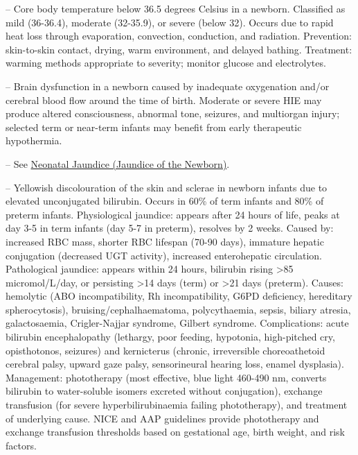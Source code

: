 -- Core body temperature below 36.5 degrees Celsius in a newborn. Classified as mild (36-36.4), moderate (32-35.9), or severe (below 32). Occurs due to rapid heat loss through evaporation, convection, conduction, and radiation. Prevention: skin-to-skin contact, drying, warm environment, and delayed bathing. Treatment: warming methods appropriate to severity; monitor glucose and electrolytes.

-- Brain dysfunction in a newborn caused by inadequate oxygenation and/or cerebral blood flow around the time of birth. Moderate or severe HIE may produce altered consciousness, abnormal tone, seizures, and multiorgan injury; selected term or near-term infants may benefit from early therapeutic hypothermia.

-- See \hyperlink{Neonatal Jaundice (Jaundice of the Newborn)}{Neonatal Jaundice (Jaundice of the Newborn)}.

-- Yellowish discolouration of the skin and sclerae in newborn infants due to elevated unconjugated bilirubin. Occurs in 60\% of term infants and 80\% of preterm infants. Physiological jaundice: appears after 24 hours of life, peaks at day 3-5 in term infants (day 5-7 in preterm), resolves by 2 weeks. Caused by: increased RBC mass, shorter RBC lifespan (70-90 days), immature hepatic conjugation (decreased UGT activity), increased enterohepatic circulation. Pathological jaundice: appears within 24 hours, bilirubin rising >85 micromol/L/day, or persisting >14 days (term) or >21 days (preterm). Causes: hemolytic (ABO incompatibility, Rh incompatibility, G6PD deficiency, hereditary spherocytosis), bruising/cephalhaematoma, polycythaemia, sepsis, biliary atresia, galactosaemia, Crigler-Najjar syndrome, Gilbert syndrome. Complications: acute bilirubin encephalopathy (lethargy, poor feeding, hypotonia, high-pitched cry, opisthotonos, seizures) and kernicterus (chronic, irreversible choreoathetoid cerebral palsy, upward gaze palsy, sensorineural hearing loss, enamel dysplasia). Management: phototherapy (most effective, blue light 460-490 nm, converts bilirubin to water-soluble isomers excreted without conjugation), exchange transfusion (for severe hyperbilirubinaemia failing phototherapy), and treatment of underlying cause. NICE and AAP guidelines provide phototherapy and exchange transfusion thresholds based on gestational age, birth weight, and risk factors.


